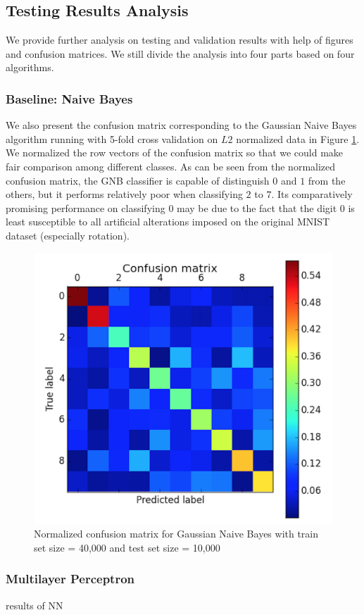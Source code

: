 \documentclass{acm_proc_article-sp}
\begin{document}
\subsection{Testing Results Analysis}
We provide further analysis on testing and validation results with help of figures and confusion matrices. We still divide the analysis into four parts based on four algorithms.

\subsubsection{Baseline: Naive Bayes}
We also present the confusion matrix corresponding to the Gaussian Naive Bayes algorithm running with 5-fold cross validation on $L2$ normalized data in Figure \ref{fig:gnb_cm}. We normalized the row vectors of the confusion matrix so that we could make fair comparison among different classes. As can be seen from the normalized confusion matrix, the GNB classifier is capable of distinguish $0$ and $1$ from the others, but it performs relatively poor when classifying $2$ to $7$. Its comparatively promising performance on classifying $0$ may be due to the fact that the digit $0$ is least susceptible to all artificial alterations imposed on the original MNIST dataset (especially rotation).
\begin{figure} 
\centering
\includegraphics[width=0.8\columnwidth]{graphs/gnb_cm1.png}  
\caption{Normalized confusion matrix for Gaussian Naive Bayes with train set size = 40,000 and test set size = 10,000}
\label{fig:gnb_cm}
\end{figure}


\subsubsection{Multilayer Perceptron}
results of NN
\end{document}
